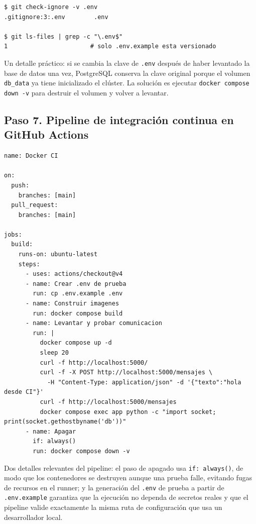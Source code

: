 \documentclass[12pt,a4paper]{article}
\begin{document}
\begin{lstlisting}[caption=Verificacion de que .env esta ignorado por Git,style=estiloshell]
$ git check-ignore -v .env
.gitignore:3:.env        .env

$ git ls-files | grep -c "\.env$"
1                       # solo .env.example esta versionado
\end{lstlisting}

Un detalle pr\'actico: si se cambia la clave de \texttt{.env} despu\'es de haber levantado
la base de datos una vez, PostgreSQL conserva la clave original porque el volumen
\texttt{db\_data} ya tiene inicializado el cl\'uster. La soluci\'on es ejecutar
\texttt{docker compose down -v} para destruir el volumen y volver a levantar.

\subsection{Paso 7. Pipeline de integraci\'on continua en GitHub Actions}

\begin{lstlisting}[caption=Contenido de .github/workflows/docker.yml,language={}]
name: Docker CI

on:
  push:
    branches: [main]
  pull_request:
    branches: [main]

jobs:
  build:
    runs-on: ubuntu-latest
    steps:
      - uses: actions/checkout@v4
      - name: Crear .env de prueba
        run: cp .env.example .env
      - name: Construir imagenes
        run: docker compose build
      - name: Levantar y probar comunicacion
        run: |
          docker compose up -d
          sleep 20
          curl -f http://localhost:5000/
          curl -f -X POST http://localhost:5000/mensajes \
            -H "Content-Type: application/json" -d '{"texto":"hola desde CI"}'
          curl -f http://localhost:5000/mensajes
          docker compose exec app python -c "import socket; print(socket.gethostbyname('db'))"
      - name: Apagar
        if: always()
        run: docker compose down -v
\end{lstlisting}

Dos detalles relevantes del pipeline: el paso de apagado usa \texttt{if: always()}, de modo
que los contenedores se destruyen aunque una prueba falle, evitando fugas de recursos en
el runner; y la generaci\'on del \texttt{.env} de prueba a partir de \texttt{.env.example}
garantiza que la ejecuci\'on no dependa de secretos reales y que el pipeline valide
exactamente la misma ruta de configuraci\'on que usa un desarrollador local.
\end{document}
